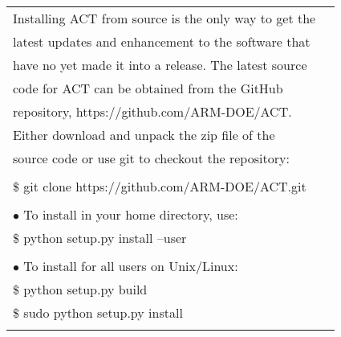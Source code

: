 \documentclass[potrait, z1paper, fontscale=0.33]{baposter} %
\begin{document}
\begin{poster}
{\begin{flushleft}
\begin{tabular}{@{}ll@{}}
Installing ACT from source is the only way to get the\\
latest updates and enhancement to the software that\\
have no yet made it into a release. The latest source\\
code for ACT can be obtained from the GitHub\\
repository, https://github.com/ARM-DOE/ACT.\\
Either download and unpack the zip file of the\\
source code or use git to checkout the repository:\\
\\
\-\hspace{0.1cm} \$ git clone https://github.com/ARM-DOE/ACT.git\\
\\
\-\hspace{0.1cm} $\bullet$ To install in your home directory, use:\\
\-\hspace{0.1cm} \$ python setup.py install --user\\
\\
\-\hspace{0.1cm} $\bullet$ To install for all users on Unix/Linux:\\
\-\hspace{0.1cm} \$ python setup.py build\\
\-\hspace{0.1cm} \$ sudo python setup.py install\\
\\

\end{tabular}
\end{flushleft}
}



\end{poster}
\end{document}
